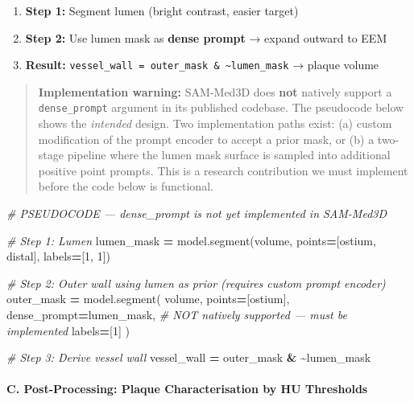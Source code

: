 \documentclass[
  11pt,
]{article}
\newenvironment{Shaded}{\begin{snugshade}}{\end{snugshade}}
\newcommand{\CommentTok}[1]{\textcolor[rgb]{0.56,0.35,0.01}{\textit{#1}}}
\newcommand{\DecValTok}[1]{\textcolor[rgb]{0.00,0.00,0.81}{#1}}
\newcommand{\NormalTok}[1]{#1}
\newcommand{\OperatorTok}[1]{\textcolor[rgb]{0.81,0.36,0.00}{\textbf{#1}}}
\providecommand{\tightlist}{%
  \setlength{\itemsep}{0pt}\setlength{\parskip}{0pt}}
\begin{document}
\begin{enumerate}
\def\labelenumi{\arabic{enumi}.}
\tightlist
\item
  \textbf{Step 1:} Segment lumen (bright contrast, easier target)
\item
  \textbf{Step 2:} Use lumen mask as \textbf{dense prompt} → expand
  outward to EEM
\item
  \textbf{Result:}
  \texttt{vessel\_wall\ =\ outer\_mask\ \&\ \textasciitilde{}lumen\_mask}
  → plaque volume
\end{enumerate}

\begin{quote}
\textbf{Implementation warning:} SAM-Med3D does \textbf{not} natively
support a \texttt{dense\_prompt} argument in its published codebase. The
pseudocode below shows the \emph{intended} design. Two implementation
paths exist: (a) custom modification of the prompt encoder to accept a
prior mask, or (b) a two-stage pipeline where the lumen mask surface is
sampled into additional positive point prompts. This is a research
contribution we must implement before the code below is functional.
\end{quote}

\begin{Shaded}
\begin{Highlighting}[]
\CommentTok{\# PSEUDOCODE — dense\_prompt is not yet implemented in SAM{-}Med3D}

\CommentTok{\# Step 1: Lumen}
\NormalTok{lumen\_mask }\OperatorTok{=}\NormalTok{ model.segment(volume, points}\OperatorTok{=}\NormalTok{[ostium, distal], labels}\OperatorTok{=}\NormalTok{[}\DecValTok{1}\NormalTok{, }\DecValTok{1}\NormalTok{])}

\CommentTok{\# Step 2: Outer wall using lumen as prior (requires custom prompt encoder)}
\NormalTok{outer\_mask }\OperatorTok{=}\NormalTok{ model.segment(}
\NormalTok{    volume,}
\NormalTok{    points}\OperatorTok{=}\NormalTok{[ostium],}
\NormalTok{    dense\_prompt}\OperatorTok{=}\NormalTok{lumen\_mask,  }\CommentTok{\# NOT natively supported — must be implemented}
\NormalTok{    labels}\OperatorTok{=}\NormalTok{[}\DecValTok{1}\NormalTok{]}
\NormalTok{)}

\CommentTok{\# Step 3: Derive vessel wall}
\NormalTok{vessel\_wall }\OperatorTok{=}\NormalTok{ outer\_mask }\OperatorTok{\&} \OperatorTok{\textasciitilde{}}\NormalTok{lumen\_mask}
\end{Highlighting}
\end{Shaded}

\paragraph{C. Post-Processing: Plaque Characterisation by HU
Thresholds}\label{c.-post-processing-plaque-characterisation-by-hu-thresholds}
\end{document}
